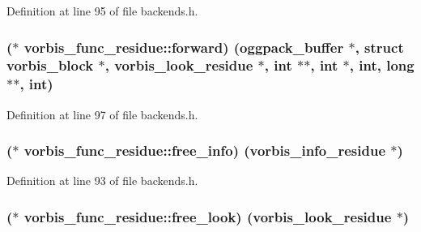 Definition at line 95 of file backends.\+h.

\subsubsection[{\texorpdfstring{forward}{forward}}]{($\ast$ vorbis\+\_\+func\+\_\+residue\+::forward) ({\bf oggpack\+\_\+buffer} $\ast$, struct {\bf vorbis\+\_\+block} $\ast$, {\bf vorbis\+\_\+look\+\_\+residue} $\ast$, {\bf int} $\ast$$\ast$, {\bf int} $\ast$, {\bf int}, long $\ast$$\ast$, {\bf int})}\hypertarget{structvorbis__func__residue_a33cb44003f0be6c4f5e1fb466e1dd9b9}{}\label{structvorbis__func__residue_a33cb44003f0be6c4f5e1fb466e1dd9b9}


Definition at line 97 of file backends.\+h.

\subsubsection[{\texorpdfstring{free\+\_\+info}{free_info}}]{($\ast$ vorbis\+\_\+func\+\_\+residue\+::free\+\_\+info) ({\bf vorbis\+\_\+info\+\_\+residue} $\ast$)}\hypertarget{structvorbis__func__residue_a9feb040bb6f617ad857b413fe0f56744}{}\label{structvorbis__func__residue_a9feb040bb6f617ad857b413fe0f56744}


Definition at line 93 of file backends.\+h.

\subsubsection[{\texorpdfstring{free\+\_\+look}{free_look}}]{($\ast$ vorbis\+\_\+func\+\_\+residue\+::free\+\_\+look) ({\bf vorbis\+\_\+look\+\_\+residue} $\ast$)}\hypertarget{structvorbis__func__residue_a05f20e87c67f5e2ee5d5342fdaa75dfa}{}\label{structvorbis__func__residue_a05f20e87c67f5e2ee5d5342fdaa75dfa}


